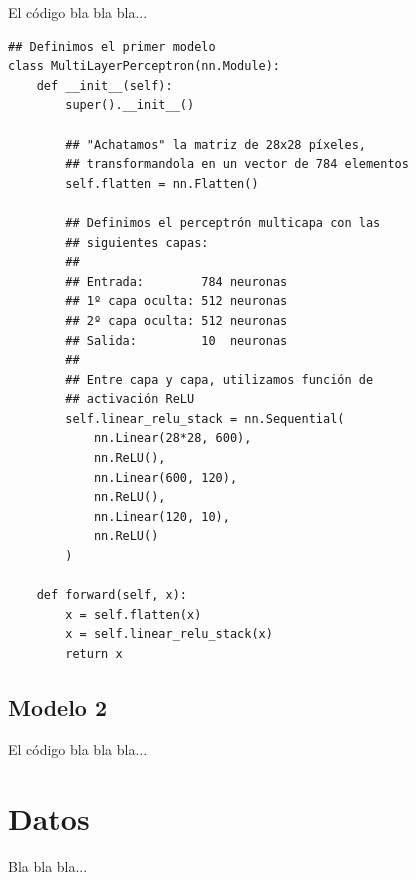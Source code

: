 \documentclass[aps,prl,twocolumn,groupedaddress]{revtex4-2}
\begin{document}
El código bla bla bla...

\begin{verbatim}
## Definimos el primer modelo
class MultiLayerPerceptron(nn.Module):
    def __init__(self):
        super().__init__()

        ## "Achatamos" la matriz de 28x28 píxeles, 
        ## transformandola en un vector de 784 elementos
        self.flatten = nn.Flatten()

        ## Definimos el perceptrón multicapa con las
        ## siguientes capas:
        ##
        ## Entrada:        784 neuronas
        ## 1º capa oculta: 512 neuronas
        ## 2º capa oculta: 512 neuronas
        ## Salida:         10  neuronas
        ##
        ## Entre capa y capa, utilizamos función de 
        ## activación ReLU
        self.linear_relu_stack = nn.Sequential(
            nn.Linear(28*28, 600),
            nn.ReLU(),
            nn.Linear(600, 120),
            nn.ReLU(),
            nn.Linear(120, 10),
            nn.ReLU()
        )

    def forward(self, x):
        x = self.flatten(x)
        x = self.linear_relu_stack(x)
        return x
\end{verbatim}

\subsection{Modelo 2}

El código bla bla bla...

\section{Datos}

Bla bla bla...
\end{document}
